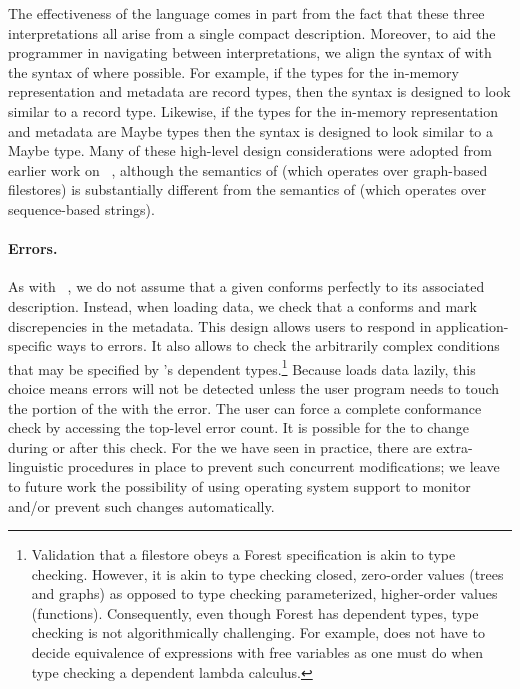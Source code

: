 The effectiveness of the \forest{} language comes in part from the fact 
that these three interpretations all arise from a single compact description.  
Moreover, to aid the programmer in navigating between interpretations, we
align the syntax of \forest{} with the syntax of \haskell{} where possible.
For example, if the \haskell{} types for the in-memory representation and
metadata are record types, then the \forest{} syntax is designed to look similar
to a \haskell{} record type.  Likewise,  if the \haskell{} types for the in-memory representation and
metadata are Maybe types then the \forest{} syntax is designed to look similar
to a \haskell{} Maybe type.  
Many of these high-level design considerations were adopted
from earlier work on 
\pads{}~\cite{fisher+:pads,fisher+:toplas,mandelbaum+:pads-ml}, although 
the semantics of \forest{} (which operates over graph-based filestores)
is substantially different from the semantics
of \pads{} (which operates over sequence-based strings).

\paragraph{Errors.}
As with
\pads{}~\cite{fisher+:pads,fisher+:toplas,mandelbaum+:pads-ml}, we do
not assume that a given \filestore{} conforms perfectly to its associated
\forest{} description.  Instead, when loading data, we check that a 
\filestore{} conforms and mark discrepencies
in the metadata.  This design allows users to respond in
application-specific ways to errors.  It also allows \forest{} to check
the arbitrarily complex conditions that may be specified by 
\forest{}'s dependent types.\footnote{Validation that a filestore
  obeys a Forest specification is akin to type checking.  However, 
it is akin to type checking closed, zero-order values (trees and graphs)
as opposed to type checking parameterized, higher-order values (functions).
Consequently, even though Forest has dependent types, type checking 
is not algorithmically challenging.  For example, \forest{} does not
have to decide equivalence of expressions with free variables as one  
must do when type checking a dependent lambda calculus.}  
Because \forest{} loads data
lazily, this choice means errors will not be detected unless the user
program needs to touch the portion of the \filestore{} with the
error. The user can force a complete conformance check by accessing
the top-level error count.  It is possible for the
\filestore{} to change during or after this check.  For the
\filestores{} we have seen in practice, there are
extra-linguistic procedures in place to prevent such concurrent
modifications; we leave to future work the possibility of 
using operating system support to monitor and/or prevent
such changes automatically. 

